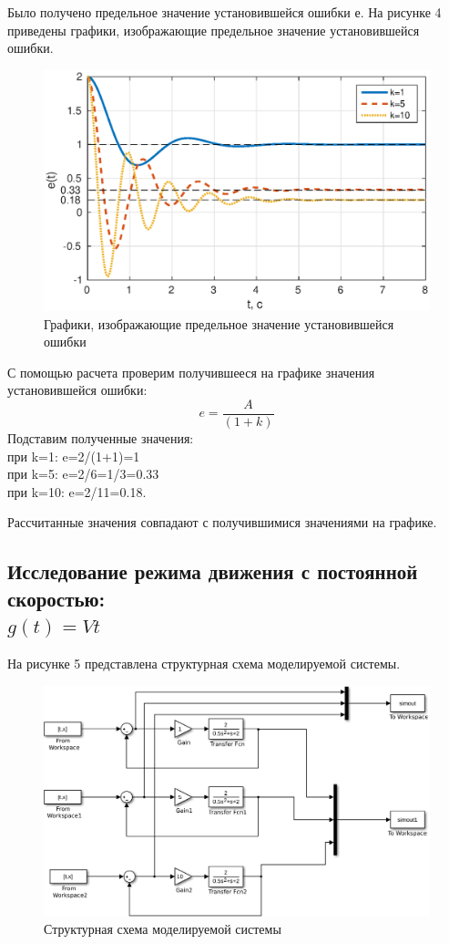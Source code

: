 \documentclass[12pt,a4paper]{article}
\begin{document}
Было получено предельное значение установившейся ошибки е. На рисунке 4 приведены графики, изображающие предельное значение установившейся ошибки. 
\begin{figure}[H]
\centering
\includegraphics[width=\textwidth]{1/1_1e.eps}
\caption{Графики, изображающие предельное значение установившейся ошибки}
\end{figure}

\newpage
С помощью расчета проверим получившееся на графике значения установившейся ошибки:
\begin{equation}
e=\frac{A}{(1+k)}
\end{equation}
Подставим полученные значения:
\\при k=1: e=2/(1+1)=1
\\при k=5: e=2/6=1/3=0.33
\\при k=10: e=2/11=0.18.

Рассчитанные значения совпадают с получившимися значениями на графике.

\subsection{Исследование режима движения с постоянной скоростью: \\$g(t)=Vt$}

На рисунке 5 представлена структурная схема моделируемой системы.
\begin{figure}[H]
\centering
\includegraphics[width=\textwidth]{1/1_2.eps}
\caption{Структурная схема моделируемой  системы}
\end{figure}
\end{document}
